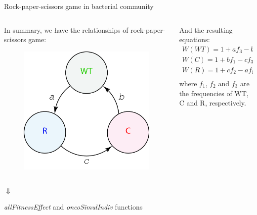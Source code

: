 \begin{frame}{Rock-paper-scissors game in bacterial community}
	\begin{columns}
		\begin{column}{0.5\textwidth}
			\begin{center}
				In summary, we have the relationships of rock-paper-scissors game:
			\end{center}
			\begin{figure}
				\includegraphics[scale=0.12]{img/figure_rock-scissor-paper.jpg}			
			\end{figure}
		\end{column}
		\begin{column}{0.5\textwidth}
			\begin{center}
				And the resulting equations:
			\begin{align*}
				W\left(WT\right) = 1 + af_3 - bf_2\\
				W\left(C\right) = 1 + bf_1 - cf_3\\
				W\left(R\right) = 1 + cf_2 - af_1\\
			\end{align*}
			where $f_1$, $f_2$ and $f_3$ are the frequencies of WT, C and R, respectively. 
			\end{center}
		\end{column}
	\end{columns}
	\pause
	\begin{center}
		{\LARGE $\Downarrow$\\}
		\begin{block}
			{\centering
				\textit{allFitnessEffect} and \textit{oncoSimulIndiv} functions
			}
		\end{block}
	\end{center}	
\end{frame}

